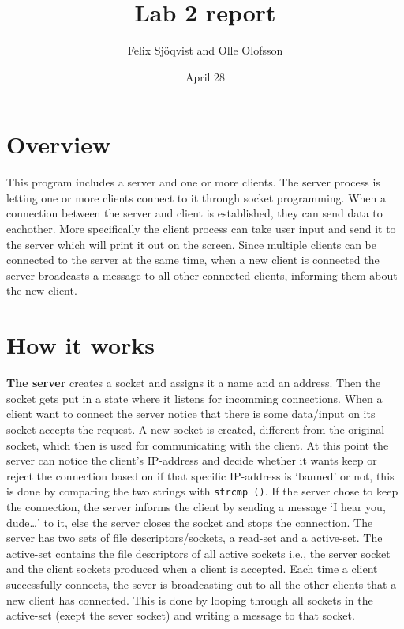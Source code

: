 \documentclass{article}
\title{Lab 2 report}
\author{Felix Sjöqvist and Olle Olofsson}
\date{April 28}
\begin{document}
\maketitle
\section{Overview}
This program includes a server and one or more clients. The server process is letting one or more clients connect to it through socket programming. When a connection between the server and client is established, they can send data to eachother. More specifically the client process can take user input and send it to the server which will print it out on the screen. Since multiple clients can be connected to the server at the same time, when a new client is connected the server broadcasts a message to all other connected clients, informing them about the new client.



\section{How it works}
\textbf{The server} creates a socket and assigns it a name and an address. Then the socket gets put in a state where it listens for incomming connections. When a client want to connect the server notice that there is some data/input on its socket accepts the request. A new socket is created, different from the original socket, which then is used for communicating with the client. At this point the server can notice the client's IP-address and decide whether it wants keep or reject the connection based on if that specific IP-address is `banned' or not, this is done by comparing the two strings with \texttt{strcmp ()}. If the server chose to keep the connection, the server informs the client by sending a message `I hear you, dude\ldots' to it, else the server closes the socket and stops the connection. The server has two sets of file descriptors/sockets, a read-set and a active-set. The active-set contains the file descriptors of all active sockets i.e., the server socket and the client sockets produced when a client is accepted. Each time a client successfully connects, the sever is broadcasting out to all the other clients that a new client has connected. This is done by looping through all sockets in the active-set (exept the sever socket) and writing a message to that socket.
\end{document}
